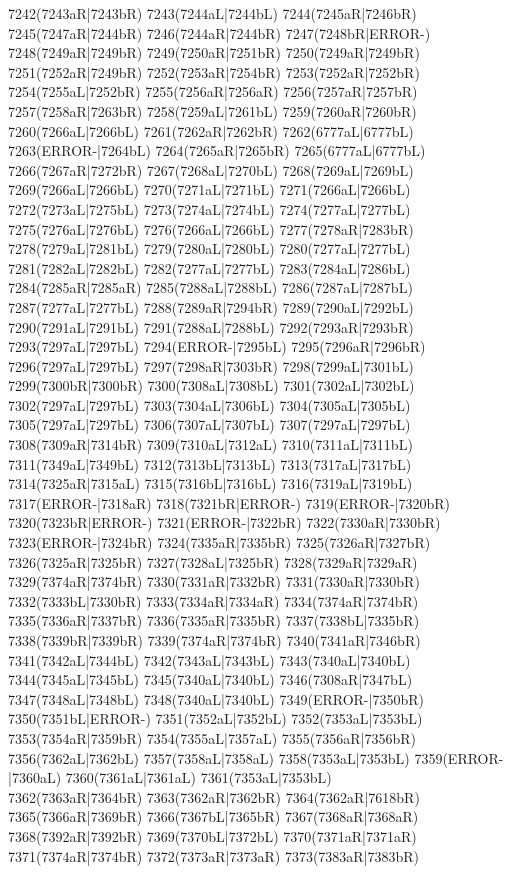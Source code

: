 7242(7243aR|7243bR) 7243(7244aL|7244bL) 7244(7245aR|7246bR) \\7245(7247aR|7244bR) 7246(7244aR|7244bR) 7247(7248bR|ERROR-) 7248(7249aR|7249bR) 7249(7250aR|7251bR) 7250(7249aR|7249bR) 7251(7252aR|7249bR) 7252(7253aR|7254bR) 7253(7252aR|7252bR) \\7254(7255aL|7252bR) 7255(7256aR|7256aR) 7256(7257aR|7257bR) 7257(7258aR|7263bR) 7258(7259aL|7261bL) 7259(7260aR|7260bR) 7260(7266aL|7266bL) 7261(7262aR|7262bR) 7262(6777aL|6777bL) \\7263(ERROR-|7264bL) 7264(7265aR|7265bR) 7265(6777aL|6777bL) 7266(7267aR|7272bR) 7267(7268aL|7270bL) 7268(7269aL|7269bL) 7269(7266aL|7266bL) 7270(7271aL|7271bL) 7271(7266aL|7266bL) \\7272(7273aL|7275bL) 7273(7274aL|7274bL) 7274(7277aL|7277bL) 7275(7276aL|7276bL) 7276(7266aL|7266bL) 7277(7278aR|7283bR) 7278(7279aL|7281bL) 7279(7280aL|7280bL) 7280(7277aL|7277bL) \\7281(7282aL|7282bL) 7282(7277aL|7277bL) 7283(7284aL|7286bL) 7284(7285aR|7285aR) 7285(7288aL|7288bL) 7286(7287aL|7287bL) 7287(7277aL|7277bL) 7288(7289aR|7294bR) 7289(7290aL|7292bL) \\7290(7291aL|7291bL) 7291(7288aL|7288bL) 7292(7293aR|7293bR) 7293(7297aL|7297bL) 7294(ERROR-|7295bL) 7295(7296aR|7296bR) 7296(7297aL|7297bL) 7297(7298aR|7303bR) 7298(7299aL|7301bL) \\7299(7300bR|7300bR) 7300(7308aL|7308bL) 7301(7302aL|7302bL) 7302(7297aL|7297bL) 7303(7304aL|7306bL) 7304(7305aL|7305bL) 7305(7297aL|7297bL) 7306(7307aL|7307bL) 7307(7297aL|7297bL) \\7308(7309aR|7314bR) 7309(7310aL|7312aL) 7310(7311aL|7311bL) 7311(7349aL|7349bL) 7312(7313bL|7313bL) 7313(7317aL|7317bL) 7314(7325aR|7315aL) 7315(7316bL|7316bL) 7316(7319aL|7319bL) \\7317(ERROR-|7318aR) 7318(7321bR|ERROR-) 7319(ERROR-|7320bR) 7320(7323bR|ERROR-) 7321(ERROR-|7322bR) 7322(7330aR|7330bR) 7323(ERROR-|7324bR) 7324(7335aR|7335bR) 7325(7326aR|7327bR) \\7326(7325aR|7325bR) 7327(7328aL|7325bR) 7328(7329aR|7329aR) 7329(7374aR|7374bR) 7330(7331aR|7332bR) 7331(7330aR|7330bR) 7332(7333bL|7330bR) 7333(7334aR|7334aR) 7334(7374aR|7374bR) \\7335(7336aR|7337bR) 7336(7335aR|7335bR) 7337(7338bL|7335bR) 7338(7339bR|7339bR) 7339(7374aR|7374bR) 7340(7341aR|7346bR) 7341(7342aL|7344bL) 7342(7343aL|7343bL) 7343(7340aL|7340bL) \\7344(7345aL|7345bL) 7345(7340aL|7340bL) 7346(7308aR|7347bL) 7347(7348aL|7348bL) 7348(7340aL|7340bL) 7349(ERROR-|7350bR) 7350(7351bL|ERROR-) 7351(7352aL|7352bL) 7352(7353aL|7353bL) \\7353(7354aR|7359bR) 7354(7355aL|7357aL) 7355(7356aR|7356bR) 7356(7362aL|7362bL) 7357(7358aL|7358aL) 7358(7353aL|7353bL) 7359(ERROR-|7360aL) 7360(7361aL|7361aL) 7361(7353aL|7353bL) \\7362(7363aR|7364bR) 7363(7362aR|7362bR) 7364(7362aR|7618bR) 7365(7366aR|7369bR) 7366(7367bL|7365bR) 7367(7368aR|7368aR) 7368(7392aR|7392bR) 7369(7370bL|7372bL) 7370(7371aR|7371aR) \\7371(7374aR|7374bR) 7372(7373aR|7373aR) 7373(7383aR|7383bR) 